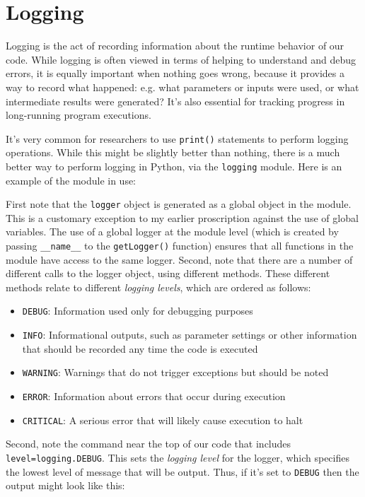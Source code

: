 \section{Logging}

Logging is the act of recording information about the runtime behavior of our code.  While logging is often viewed in terms of helping to understand and debug errors, it is equally important when nothing goes wrong, because it provides a way to record what happened: e.g. what parameters or inputs were used, or what intermediate results were generated? It's also essential for tracking progress in long-running program executions.

It's very common for researchers to use \texttt{print()} statements to perform logging operations.  While this might be slightly better than nothing, there is a much better way to perform logging in Python, via the \texttt{logging} module.  Here is an example of the module in use:



First note that the \texttt{logger} object is generated as a global object in the module.  This is a customary exception to my earlier proscription against the use of global variables. The use of a global logger at the module level (which is created by passing \texttt{\_\_name\_\_} to the \texttt{getLogger()} function) ensures that all functions in the module have access to the same logger. Second, note that there are a number of different calls to the logger object, using different methods.  These different methods relate to different \textit{logging levels}, which are ordered as follows:

\begin{itemize}
\item \texttt{DEBUG}: Information used only for debugging purposes
\item \texttt{INFO}: Informational outputs, such as parameter settings or other information that should be recorded any time the code is executed
\item \texttt{WARNING}: Warnings that do not trigger exceptions but should be noted
\item \texttt{ERROR}: Information about errors that occur during execution
\item \texttt{CRITICAL}: A serious error that will likely cause execution to halt
\end{itemize}

Second, note the command near the top of our code that includes \texttt{level=logging.DEBUG}. This sets the \textit{logging level} for the logger, which specifies the lowest level of message that will be output.  Thus, if it's set to \texttt{DEBUG} then the output might look like this:

